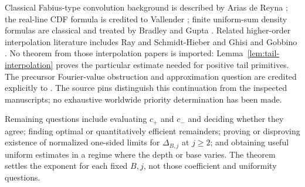 \documentclass[11pt,letterpaper]{article}
\theoremstyle{remark}\newtheorem{remark}[theorem]{Remark}
\begin{document}
Classical Fabius-type convolution background is described by Arias de Reyna \cite{Arias}; the real-line CDF formula is credited to Vallender \cite{Vallender}; finite uniform-sum density formulas are classical and treated by Bradley and Gupta \cite{BradleyGupta}. Related higher-order interpolation literature includes Ray and Schmidt-Hieber \cite{RaySchmidtHieber} and Ghisi and Gobbino \cite{GhisiGobbino}. No theorem from those interpolation papers is imported: Lemma~\ref{lem:tail-interpolation} proves the particular estimate needed for positive tail primitives. The precursor Fourier-value obstruction and approximation question are credited explicitly to \cite{Predecessor}. The source pins distinguish this continuation from the inspected manuscripts; no exhaustive worldwide priority determination has been made.

Remaining questions include evaluating $c_+$ and $c_-$ and deciding whether they agree; finding optimal or quantitatively efficient remainders; proving or disproving existence of normalized one-sided limits for $\Delta_{B,j}$ at $j\ge2$; and obtaining useful uniform estimates in a regime where the depth or base varies. The theorem settles the exponent for each fixed $B,j$, not those coefficient and uniformity questions.
\end{document}
